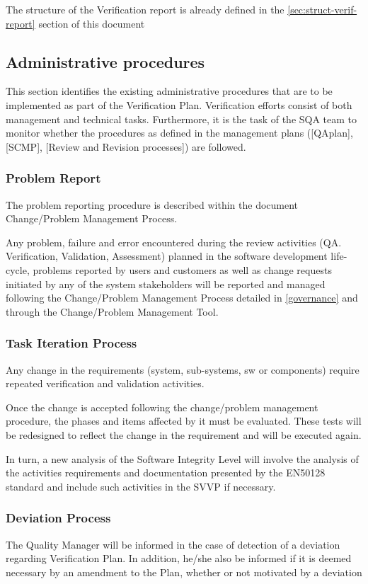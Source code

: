 \documentclass{template/openetcs_report}
\begin{document}
The structure of the Verification report is already defined in the
\ref{sec:struct-verif-report} section of this document 

\subsection{Administrative procedures}
This section identifies the existing administrative procedures that
are to be implemented as part of the Verification Plan. 
Verification efforts consist of both management and technical tasks.
Furthermore, it is the task of the SQA team to monitor whether the
procedures as defined in the management plans ([QAplan], [SCMP],
[Review and Revision processes]) are followed. 

\subsubsection{Problem Report}
The problem reporting procedure is described within the document Change/Problem Management Process.

Any problem, failure and error encountered during the review activities (QA. Verification, Validation, Assessment) planned in the software development life-cycle, problems reported by users and customers as well as change requests initiated by any of the system stakeholders will be reported and managed following the Change/Problem Management Process detailed in \href{https://github.com/openETCS/governance/tree/master/Change-Problem%20Process}{[governance]} and through the Change/Problem Management Tool.

\subsubsection{Task Iteration Process}
Any change in the requirements (system, sub-systems, sw or components)
require repeated verification and validation activities. 

Once the change is accepted following the change/problem management
procedure, the phases and items affected by it must be
evaluated. These tests will be redesigned to reflect the change in the
requirement and will be executed again. 

In turn, a new analysis of the Software Integrity Level will involve
the analysis of the activities requirements and documentation
presented by the EN50128 standard and include such activities in the
SVVP if necessary. 

\subsubsection{Deviation Process}
The Quality Manager will be informed in the case of detection of a
deviation regarding Verification Plan. In addition, he/she also be
informed if it is deemed necessary by an amendment to the Plan,
whether or not motivated by a deviation 
\end{document}
